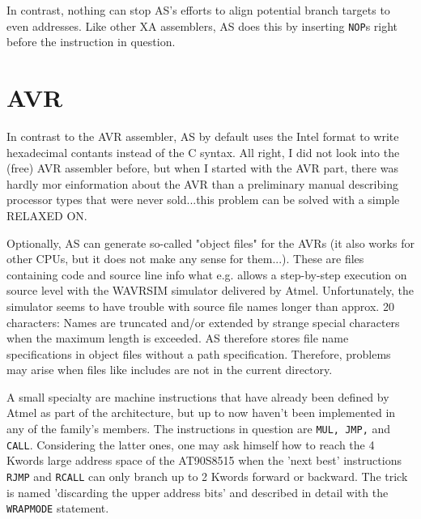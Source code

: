 \documentclass[12pt,twoside]{report}
\newcommand{\tty}[1]{{\tt #1}}
\begin{document}
In contrast, nothing can stop AS's efforts to align potential branch
targets to even addresses.  Like other XA assemblers, AS does this by
inserting \tty{NOP}s right before the instruction in question.


\section{AVR}

In contrast to the AVR assembler, AS by default uses the Intel format
to write hexadecimal contants instead of the C syntax.  All right, I
did not look into the (free) AVR assembler before, but when I started
with the AVR part, there was hardly mor einformation about the AVR
than a preliminary manual describing processor types that were never
sold...this problem can be solved with a simple RELAXED ON.

Optionally, AS can generate so-called "object files" for the AVRs (it
also works for other CPUs, but it does not make any sense for them...).
These are files containing code and source line info what e.g. allows
a step-by-step execution on source level with the WAVRSIM simulator
delivered by Atmel.  Unfortunately, the simulator seems to have
trouble with source file names longer than approx. 20 characters:
Names are truncated and/or extended by strange special characters
when the maximum length is exceeded.  AS therefore stores file name
specifications in object files without a path specification.
Therefore, problems may arise when files like includes are not in the
current directory.

A small specialty are machine instructions that have already been defined
by Atmel as part of the architecture, but up to now haven't been
implemented in any of the family's members.  The instructions in question
are {\tt MUL, JMP,} and {\tt CALL}.  Considering the latter ones, one may
ask himself how to reach the 4 Kwords large address space of the AT90S8515
when the 'next best' instructions {\tt RJMP} and {\tt RCALL} can only
branch up to 2 Kwords forward or backward.  The trick is named 'discarding
the upper address bits' and described in detail with the {\tt WRAPMODE}
statement.
\end{document}
